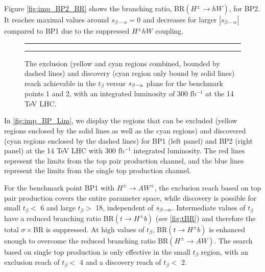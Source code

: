 Figure \ref{fig:imp_BP2_BR} shows the branching ratio, BR$(H^{\pm} \rightarrow hW)$, for BP2. It reaches maximal values around $s_{\beta-\alpha}=0$ and decreases for larger $|s_{\beta-\alpha}|$ compared to BP1 due to the suppressed $H^{\pm} hW$ coupling. 

\begin{figure}
 \centering
 {\color{gray}\hrule}
 \vspace{\onelineskip}
 \caption{The exclusion (yellow and cyan regions combined, bounded by dashed lines) and discovery (cyan region only bound by solid lines) reach achievable in the $t_{\beta}$ versus $s_{\beta-\alpha}$ plane for the benchmark points 1 and 2, with an integrated luminosity of 300 fb$^{-1}$ at the 14 TeV LHC.}
\label{fig:imp_BP_Lim}
 \vspace{\onelineskip}
{\color{gray}\hrule}
\end{figure}

In \autoref{fig:imp_BP_Lim}, we display the regions that can be excluded (yellow regions enclosed by the solid lines as well as the cyan regions) and discovered (cyan regions enclosed by the dashed lines) for BP1 (left panel) and BP2 (right panel) at the 14 TeV LHC with 300 fb$^{-1}$ integrated luminosity. The red lines represent the limits from the top pair production channel, and the blue lines represent the limits from the single top production channel.

For the benchmark point BP1 with $H^{\pm} \rightarrow AW^{\pm}$, the exclusion reach based on top pair production covers the entire parameter space, while discovery is possible for small $t_{\beta}<$ 6 and large $t_{\beta}>$ 18, independent of $s_{\beta-\alpha}$. Intermediate values of $t_{\beta}$ have a reduced branching ratio BR$(t \rightarrow H^{\pm} b)$ (see \autoref{fig:tBR}) and therefore the total $\sigma\times$BR is suppressed. At high values of $t_{\beta}$, BR$(t \rightarrow H^{\pm}b)$ is enhanced enough to overcome the reduced branching ratio BR$(H^{\pm} \rightarrow AW)$. The search based on single top production is only effective in the small $t_{\beta}$ region, with an exclusion reach of $t_{\beta} <$ 4 and a discovery reach of $t_{\beta}<$ 2. 

